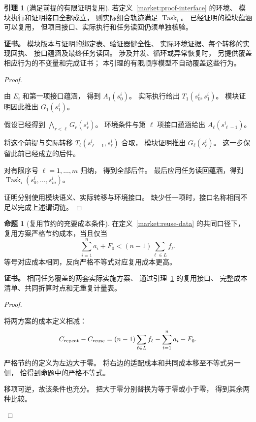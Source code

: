 \documentclass[UTF8,12pt,a4paper,openany,fontset=none,zihao=false]{ctexrep}
\theoremstyle{definition}
\newtheorem{lemma}{引理}[chapter]
\newtheorem{proposition}{命题}[chapter]
\newenvironment{certificate}{\par\noindent\textbf{证书。}\ignorespaces}{\par}
\newcommand{\1}{\mathbf 1}
\begin{document}
\begin{lemma}[满足前提的有限证明复用]
\label{market:composition}
若定义~\ref{market:proof-interface} 的环境、
模块执行和证明接口全部成立，
则实际组合轨迹满足 \(\operatorname{Task}_i\)。
已经证明的模块蕴涵可以复用，
但项目接口、实际执行和任务读回仍须单独核验。
\end{lemma}
\begin{certificate}
模块版本与证明的绑定表、验证器健全性、
实际环境证据、每个转移的实现回执、
接口蕴涵及最终任务读回。
涉及并发、循环或异常恢复时，
另提供覆盖相应行为的不变量和完成证书；
本引理的有限顺序模型不自动覆盖这些行为。
\end{certificate}
\begin{proof}
\begin{semanticsteps}
\item 由 \(E_i\) 和第一项接口蕴涵，
得到 \(A_1(s_0^i)\)。
实际执行给出 \(T_1(s_0^i,s_1^i)\)。
模块证明因此推出 \(G_1(s_1^i)\)。
\item 假设已经得到
\(\bigwedge_{r<\ell}G_r(s_r^i)\)。
环境条件与第 \(\ell\) 项接口蕴涵给出
\(A_\ell(s_{\ell-1}^i)\)。
\item 将这个前提与实际转移
\(T_\ell(s_{\ell-1}^i,s_\ell^i)\) 合取，
模块证明推出 \(G_\ell(s_\ell^i)\)。
这一步保留此前已经成立的后件。
\item 对有限序号 \(\ell=1,\ldots,m\) 归纳，
得到全部后件。
最后应用任务读回蕴涵，得到
\(\operatorname{Task}_i(s_0^i,\ldots,s_m^i)\)。
\end{semanticsteps}
证明分别使用模块语义、实际转移与环境接口。
缺少任一项时，接口名称相同不足以完成上述谓词链。
\end{proof}

\begin{proposition}[复用节约的充要成本条件]
\label{market:reuse-saving}
在定义~\ref{market:reuse-data} 的共同口径下，
复用方案严格节约成本，当且仅当
\[
 \sum_{i=1}^n a_i+F_0
 <(n-1)\sum_{\ell\in L}f_\ell.
\]
等号对应成本相同，反向严格不等式对应复用成本更高。
\end{proposition}
\begin{certificate}
相同任务覆盖的两套实际实施方案、
通过引理~\ref{market:composition} 的复用接口、
完整成本清单、共同折算时点和无重复计量表。
\end{certificate}
\begin{proof}
\begin{semanticsteps}
\item 将两方案的成本定义相减：
\[
 C_{\rm repeat}-C_{\rm reuse}
 =(n-1)\sum_{\ell\in L}f_\ell-\sum_{i=1}^n a_i-F_0.
\]
\item 严格节约的定义为左边大于零。
将右边的适配成本和共同成本移至不等式另一侧，
恰得到命题中的严格不等式。
\item 移项可逆，故该条件也充分。
把大于零分别替换为等于零或小于零，
得到其余两种比较。
\end{semanticsteps}
\end{proof}
\end{document}

